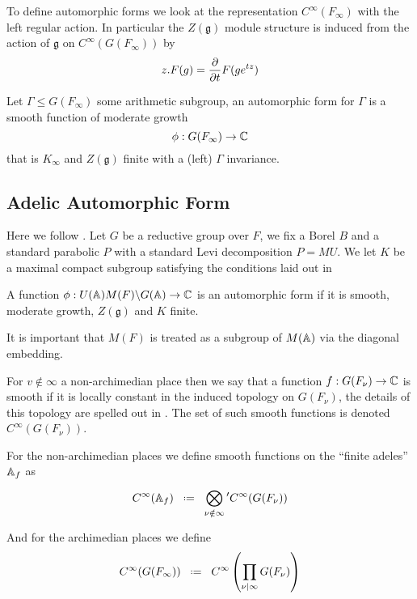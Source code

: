 	To define automorphic forms we look at the representation \(C^\infty(F_\infty)\) with the left regular action.  In particular the \(Z(\mathfrak{g})\) module structure is induced from the action of \(\mathfrak{g}\) on \(C^\infty(G(F_\infty))\) by 
	\[z.F(g) = \frac{\partial }{\partial t}F(ge^{tz})\] 

	\begin{Definition}
		Let \(\Gamma\leq G(F_\infty)\) some arithmetic subgroup, an automorphic form for \(\Gamma\) is a smooth function of moderate growth 
		\[\phi: G(F_\infty) \to \C\]
		that is \(K_\infty\) and \(Z(\mathfrak{g})\) finite with a (left) \(\Gamma\) invariance. 

	\end{Definition}

\subsection{Adelic Automorphic Form}
Here we follow \cite[I.2.17]{moeglinSpectralDecompositionEisenstein1995}. Let \(G\) be a reductive group over \(F\), we fix a Borel \(B\) and a standard parabolic \(P \) with a standard Levi decomposition \(P = MU\). We let \(K\) be a maximal compact subgroup satisfying the conditions laid out in 
\begin{definition}
    A function \(\phi: U(\A)M(F)\backslash G(\A) \to \C\) is an automorphic form if it is smooth, moderate growth, \(Z(\mathfrak{g})\) and \(K\) finite. 
\end{definition}

\begin{remark}
    It is important that \(M(F)\) is treated as a subgroup of \(M(\A)\) via the diagonal embedding.
\end{remark}

For \(v\notin \infty\) a non-archimedian place then we say that a function \(f: G(F_\nu) \to \C\) is smooth if it is locally constant in the induced topology on \(G(F_\nu)\), the details of this topology are spelled out in \cite{conradWeilGrothendieckApproaches2012}. The set of such smooth functions is denoted \(C^\infty(G(F_\nu))\).
	
	For the non-archimedian places we define smooth functions on the ``finite adeles'' \(\A_f\) as 
	\[C^\infty(\mathbb{A}_f) \defeq \bigotimes^{}_{\nu \notin \infty} \phantom{}' C^\infty(G(F_\nu)) \]
	
	And for the archimedian places we define
	\[C^\infty(G(F_\infty)) \defeq C^\infty\left(\prod_{\nu|\infty} G(F_\nu)\right)\]
	
